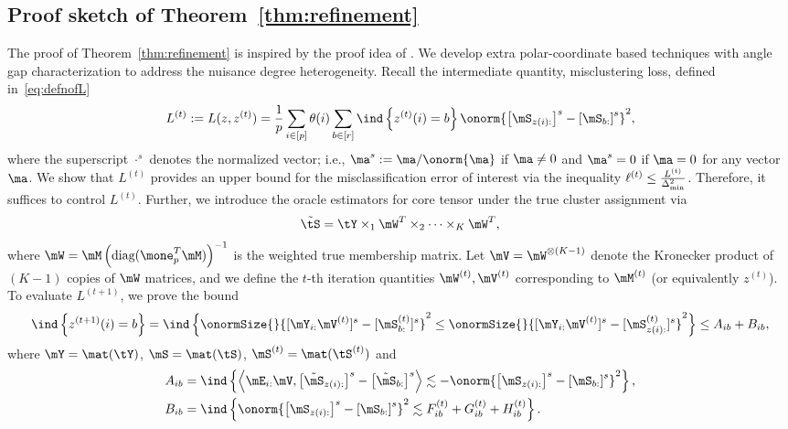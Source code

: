 \documentclass[lettersize,onecolumn,journal]{IEEEtran}
\theoremstyle{definition}
\theoremstyle{definition}
\newcommand{\of}[1]{\left(#1\right)}
\newcommand{\off}[1]{\left[#1\right]}
\newcommand{\offf}[1]{\left\{#1\right\}}
\newcommand{\ang}[1]{\left\langle#1\right\rangle}
\begin{document}
\subsection{Proof sketch of Theorem~\ref{thm:refinement}}\label{sec:thm5}
The proof of Theorem~\ref{thm:refinement} is inspired by the proof idea of \citet[Theorem 2]{han2020exact}. We develop extra polar-coordinate based techniques with angle gap characterization to address the nuisance degree heterogeneity. Recall the intermediate quantity, misclustering loss, defined in~\eqref{eq:defnofL}
\begin{equation}
     L^{(t)}:=L(z,z^{(t)})= \frac{1}{p}  \sum_{i \in [p]} \theta(i) \sum_{b \in [r]}  \ind \offf{ z^{(t)}(i) = b } \onorm{ \off{ \mS_{ z(i):}  }^s - \off{ \mS_{b:}  }^s  }^2,
\end{equation}
where the superscript $\cdot^{s}$ denotes the normalized vector; i.e., $\ma^s:=\ma/\onorm{\ma}$ if $\ma\neq 0$ and $\ma^{s}=0$ if $\ma=0$ for any vector $\ma$. We show that $L^{(t)}$ provides an upper bound for the misclassification error of interest via the inequality $\ell^{(t)}\leq {L^{(t)}\over \Delta^2_{\min}}$. Therefore, it suffices to control $L^{(t)}$. Further, we introduce the oracle estimators for core tensor under the true cluster assignment via 
\begin{equation}
    \tilde \tS = \tY \times_1 \mW^T \times_2 \cdots \times_K \mW^T, 
\end{equation}
where $\mW = \mM \of{ \text{diag}(\mone_{p}^T \mM) }^{-1}$ is the weighted true membership matrix. Let $ \mV = \mW^{\otimes (K-1)}$ denote the Kronecker product of $(K-1)$ copies of $\mW$ matrices, and we define the $t$-th iteration quantities $\mW^{(t)}, \mV^{(t)}$ corresponding to $\mM^{(t)}$ (or equivalently $z^{(t)}$). To evaluate $L^{(t+1)}$, we prove the bound
\begin{equation}\label{eq:proof_5_event}
    \ind \offf{ z^{(t+1)}(i) = b } = \ind \offf{       \onormSize{}{ [ \mY_{i:} \mV^{(t)}  ]^s - [\mS_{b:}^{(t)}]^s }^2 \leq \onormSize{}{ [ \mY_{i:} \mV^{(t)}  ]^s - [\mS_{z(i):}^{(t)}]^s }^2} \leq A_{ib} + B_{ib},
\end{equation}
where $\mY = \mat(\tY)$, $ \mS = \mat(\tS)$, $\mS^{(t)} = \mat(\tS^{(t)})$ and
\begin{align}
        A_{ib} &= \ind \offf{\ang{ \mE_{i:} \mV, \off{  \tilde \mS_{z(i):} }^s - \off{  \tilde \mS_{b:} }^s } \lesssim -  \onorm{ \off{ \mS_{z(i):}  }^s - \off{ \mS_{b:}  }^s  }^2 },\\
        B_{ib} &= \ind \offf{\onorm{ \off{ \mS_{z(i):}  }^s - \off{ \mS_{b:}  }^s  }^2 \lesssim F_{ib}^{(t)} + G_{ib}^{(t)} + H_{ib}^{(t)} }.
\end{align}
\end{document}
